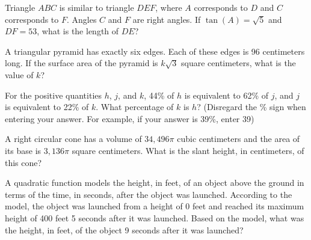 Triangle $ABC$ is similar to triangle $DEF$, where $A$ corresponds to $D$ and $C$ corresponds to $F$.  
Angles $C$ and $F$ are right angles.  
If $\tan(A) = \sqrt{5}$ and $DF = 53$, what is the length of $DE$?

\vspace{0.75em}


\vspace{2em}
\newpage

\noindent\markforreview
\vspace{1em}

A triangular pyramid has exactly six edges. Each of these edges is 96 centimeters long.  
If the surface area of the pyramid is $k\sqrt{3}$ square centimeters, what is the value of $k$?

\vspace{0.75em}


\vspace{2em}
\newpage

\noindent\markforreview
\vspace{1em}

For the positive quantities $h$, $j$, and $k$, 44\% of $h$ is equivalent to 62\% of $j$, and $j$ is equivalent to 22\% of $k$.  
What percentage of $k$ is $h$?  
(Disregard the \% sign when entering your answer. For example, if your answer is 39\%, enter 39)

\vspace{2em}
\newpage

\noindent\markforreview
\vspace{1em}

A right circular cone has a volume of $34{,}496\pi$ cubic centimeters and the area of its base is $3{,}136\pi$ square centimeters.  
What is the slant height, in centimeters, of this cone?

\vspace{0.75em}


\vspace{2em}
\newpage

\noindent\markforreview
\vspace{1em}

A quadratic function models the height, in feet, of an object above the ground in terms of the time, in seconds, after the object was launched.  
According to the model, the object was launched from a height of 0 feet and reached its maximum height of 400 feet 5 seconds after it was launched.  
Based on the model, what was the height, in feet, of the object 9 seconds after it was launched?

